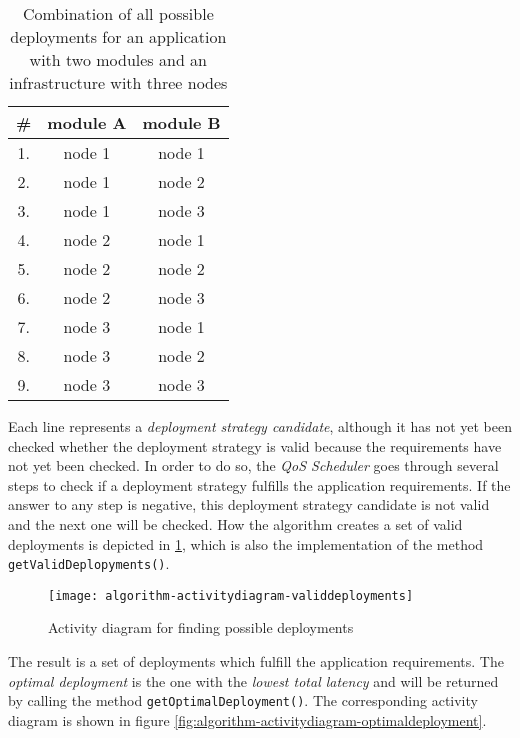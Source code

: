 \begin{table}[htb]
    \centering
    \begin{tabular}{|c||c|c|}
    \hline
        \# & \textbf{module A} & \textbf{module B}\\
         \hline\hline
         1. & node 1 & node 1\\
         \hline
         2. & node 1 & node 2\\
         \hline
         3. & node 1 & node 3\\
         \hline
         4. & node 2 & node 1\\
         \hline
         5. & node 2 & node 2\\
         \hline
         6. & node 2 & node 3\\
         \hline
         7. & node 3 & node 1\\
         \hline
         8. & node 3 & node 2\\
         \hline
         9. & node 3 & node 3\\
         \hline
    \end{tabular}
    \caption{Combination of all possible deployments for an application with two modules and an infrastructure with three nodes}
    \label{tab:deployment-combinations}
\end{table}

Each line represents a \textit{deployment strategy candidate}, although it has not yet been checked whether the deployment strategy is valid because the requirements have not yet been checked. In order to do so, the \textit{QoS Scheduler} goes through several steps to check if a deployment strategy fulfills the application requirements. If the answer to any step is negative, this deployment strategy candidate is not valid and the next one will be checked. How the algorithm creates a set of valid deployments is depicted in \ref{fig:algorithm-activitydiagram-validdeployments}, which is also the implementation of the method \texttt{getValidDeplopyments()}.

\begin{figure}[htb]
    \centering
    \texttt{[image: algorithm-activitydiagram-validdeployments]}
    \caption{Activity diagram for finding possible deployments}
    \label{fig:algorithm-activitydiagram-validdeployments}
\end{figure}

The result is a set of deployments which fulfill the application requirements. The \textit{optimal deployment} is the one with the \textit{lowest total latency} and will be returned by calling the method \texttt{getOptimalDeployment()}. The corresponding activity diagram is shown in figure \ref{fig:algorithm-activitydiagram-optimaldeployment}.


